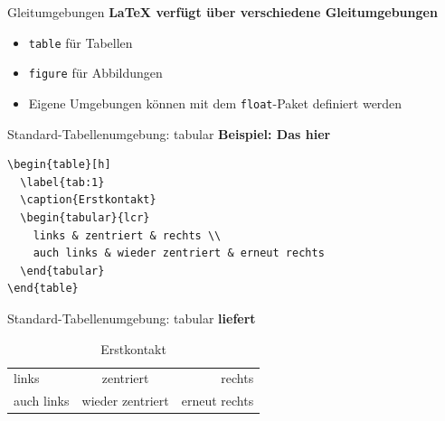 \documentclass[11pt]{beamer}
\begin{document}
\begin{frame}{Gleitumgebungen}
\textbf{{\LaTeX} verfügt über verschiedene Gleitumgebungen}
\begin{itemize}
\item \texttt{table} für Tabellen
\item \texttt{figure} für Abbildungen
\item Eigene Umgebungen können mit dem \texttt{float}-Paket definiert werden 
\end{itemize}
\end{frame}

{

}

{

}

\begin{frame}[fragile]{Standard-Tabellenumgebung: tabular}
\textbf{Beispiel: Das hier}
\begin{verbatim}
\begin{table}[h]
  \label{tab:1}
  \caption{Erstkontakt}
  \begin{tabular}{lcr}
    links & zentriert & rechts \\
    auch links & wieder zentriert & erneut rechts
  \end{tabular}
\end{table}
\end{verbatim}
\end{frame}

\begin{frame}[fragile]{Standard-Tabellenumgebung: tabular}
\textbf{liefert}
\begin{table}[h]
  \label{tab:1}
  \caption{Erstkontakt}
  \begin{tabular}{lcr}
    links & zentriert & rechts \\
    auch links & wieder zentriert & erneut rechts
  \end{tabular}
\end{table}
\end{frame}

{

}
\end{document}
